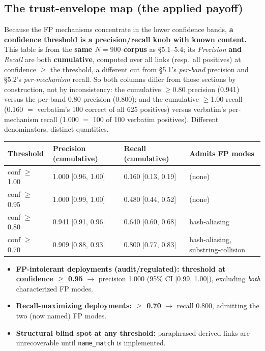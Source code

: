 \documentclass[11pt]{article}
\begin{document}
\subsection{The trust-envelope map (the applied payoff)}

Because the FP mechanisms concentrate in the lower confidence bands, \textbf{a confidence threshold is a
precision/recall knob with known content.} This table is from the \textbf{same $N=900$ corpus} as
\S5.1--5.4; its \emph{Precision} \textbf{and} \emph{Recall} are both \textbf{cumulative}, computed over all links
(resp.\ all positives) at confidence $\geq$ the threshold, a different cut from \S5.1's \emph{per-band}
precision and \S5.2's \emph{per-mechanism} recall. So both columns differ from those sections by
construction, not by inconsistency: the cumulative $\geq$0.80 precision (0.941) versus the per-band 0.80
precision (0.800); and the cumulative $\geq$1.00 recall (0.160 $=$ verbatim's 100 correct of all 625
positives) versus verbatim's per-mechanism recall (1.000 $=$ 100 of 100 verbatim positives). Different
denominators, distinct quantities.

\begin{table}[h]
\centering
\small
\begin{tabular}{@{}llll@{}}
\toprule
Threshold & Precision (cumulative) & Recall (cumulative) & Admits FP modes \\
\midrule
conf $\geq$ 1.00 & 1.000 [0.96, 1.00] & 0.160 [0.13, 0.19] & (none) \\
conf $\geq$ 0.95 & 1.000 [0.99, 1.00] & 0.480 [0.44, 0.52] & (none) \\
conf $\geq$ 0.80 & 0.941 [0.91, 0.96] & 0.640 [0.60, 0.68] & hash-aliasing \\
conf $\geq$ 0.70 & 0.909 [0.88, 0.93] & 0.800 [0.77, 0.83] & hash-aliasing, substring-collision \\
\bottomrule
\end{tabular}
\end{table}

\begin{itemize}[leftmargin=*]
\item \textbf{FP-intolerant deployments (audit/regulated): threshold at confidence $\geq$ 0.95} $\rightarrow$
precision 1.000 (95\% CI [0.99, 1.00]), excluding \emph{both} characterized FP modes.
\item \textbf{Recall-maximizing deployments: $\geq$ 0.70} $\rightarrow$ recall 0.800, admitting the two (now
named) FP modes.
\item \textbf{Structural blind spot at any threshold:} paraphrased-derived links are unrecoverable until
\texttt{name\_match} is implemented.
\end{itemize}
\end{document}
